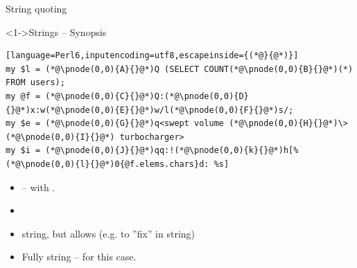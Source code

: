 \begin{frame}[fragile]{String quoting}
\begin{block}<1->{Strings -- Synopsis}
\small
\begin{lstlisting}[language=Perl6,inputencoding=utf8,escapeinside={(*@}{@*)}]
my $l = (*@\pnode(0,0){A}{}@*)Q (SELECT COUNT(*@\pnode(0,0){B}{}@*)(*) FROM users);
my @f = (*@\pnode(0,0){C}{}@*)Q:(*@\pnode(0,0){D}{}@*)x:w(*@\pnode(0,0){E}{}@*)w/l(*@\pnode(0,0){F}{}@*)s/;
my $e = (*@\pnode(0,0){G}{}@*)q<swept volume (*@\pnode(0,0){H}{}@*)\>(*@\pnode(0,0){I}{}@*) turbocharger>
my $i = (*@\pnode(0,0){J}{}@*)qq:!(*@\pnode(0,0){k}{}@*)h[%(*@\pnode(0,0){l}{}@*)0{@f.elems.chars}d: %s]
\end{lstlisting}
\end{block}

\begin{itemize}
\item<2->  -- with .
\item<3->   \textrightarrow{}  \textrightarrow{} 
\item<4->  string, but allows  (e.g. to ''fix''  in string)
\item<5-> Fully  string --  for this  case.
\end{itemize}
\end{frame}

